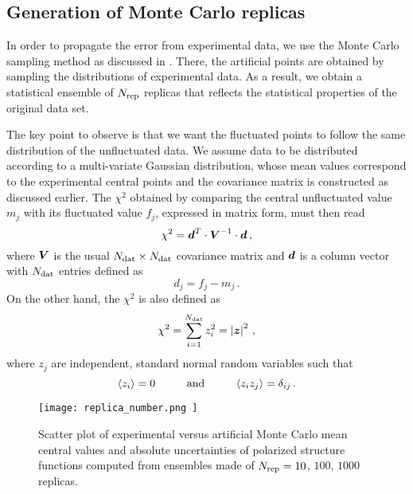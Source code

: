 \subsection*{Generation of Monte Carlo replicas}
In order to propagate the error from experimental data, we use the Monte Carlo sampling method as discussed in . There, the artificial points are obtained by sampling the distributions of experimental data. As a result, we obtain a statistical ensemble of $N_{\textrm{rep}}$ replicas that reflects the statistical properties of the original data set.%

The key point to observe is that we want the fluctuated points to follow the same distribution of the unfluctuated data. We assume data to be distributed according to a multi-variate Gaussian distribution, whose mean values correspond to the experimental central points and the covariance matrix is constructed as discussed earlier. The $\chi^2$ obtained by comparing the central unfluctuated value $m_j$ with its fluctuated value $f_j$, expressed in matrix form, must then read
\begin{equation}
  \chi^2 = {\vb*{d}}^{T} \cdot \vb*{V}^{-1} \cdot \vb*{d} \,,
  \label{eq:chi_fluc}
\end{equation}
where $\vb*{V}$ is the usual $N_{\textrm{dat}} \times N_{\textrm{dat}}$ covariance matrix and $\vb*{d}$ is a column vector with $N_{\textrm{dat}}$ entries defined as
\begin{equation}
  d_j = f_j - m_j \,.
\end{equation}
On the other hand, the $\chi^2$ is also defined as
\begin{equation}
  \chi^2 = \sum_{i=1}^{N_{\textrm{dat}}} z_i^2 = \left| \vb*{z} \right|^2 \,,
  \label{eq:chi2_normal}
\end{equation}
where $z_j$ are independent, standard normal random variables such that
\begin{equation}
  \langle z_i \rangle = 0 \hspace{10mm} \T{and} \hspace{10mm}  \langle z_i z_j \rangle = \delta_{ij} \,.
\end{equation}
\begin{figure}[t]
  \centering
  \texttt{[image: replica\_number.png ]} 
  \caption{\small{Scatter plot of experimental versus artificial Monte Carlo mean central values and absolute uncertainties of polarized structure functions computed from ensembles made of $N_{\textrm{rep}} = 10$, $100$, $1000$ replicas.}}
  \label{fig:replica_number}
\end{figure}
